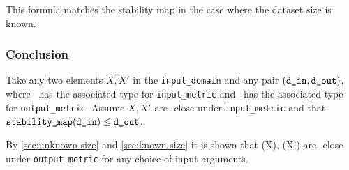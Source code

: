 \documentclass{article}
\begin{document}
This formula matches the stability map in the case where the dataset size is known.

\subsubsection{Conclusion}
Take any two elements $X, X'$ in the \texttt{input\_domain} and any pair $(\texttt{d\_in}, \texttt{d\_out})$, 
where \din\ has the associated type for \texttt{input\_metric} and \dout\ has the associated type for \texttt{output\_metric}.
Assume $X, X'$ are \din-close under \texttt{input\_metric} and that $\texttt{stability\_map}(\texttt{d\_in}) \leq \texttt{d\_out}$. 

By \ref{sec:unknown-size} and \ref{sec:known-size} it is shown that \function(X), \function(X') are \dout-close under \texttt{output\_metric} for any choice of input arguments.




\end{document}
